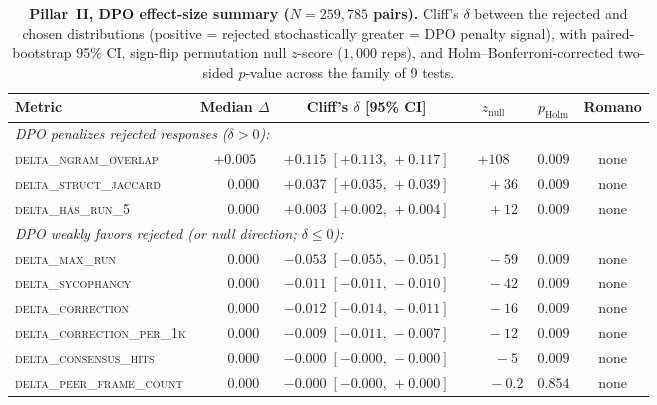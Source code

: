 \documentclass{article}
\begin{document}
\begin{table}[H]
\centering
\small
\caption{\textbf{Pillar~II, DPO effect-size summary ($N{=}259{,}785$ pairs).} Cliff's $\delta$ between the rejected and chosen distributions (positive = rejected stochastically greater = DPO penalty signal), with paired-bootstrap 95\% CI, sign-flip permutation null $z$-score ($1{,}000$ reps), and Holm--Bonferroni-corrected two-sided $p$-value across the family of 9 tests.}
\label{tab:data_audit}
\setlength{\tabcolsep}{4pt}
\begin{tabular}{lccccc}
\toprule
\textbf{Metric} & \textbf{Median $\Delta$} & \textbf{Cliff's $\delta$ [95\% CI]} & \textbf{$z_{\text{null}}$} & \textbf{$p_{\text{Holm}}$} & \textbf{Romano} \\
\midrule
\multicolumn{6}{l}{\emph{DPO penalizes rejected responses ($\delta>0$):}}\\
\textsc{delta\_ngram\_overlap}     & $+0.005$ & $+0.115\;[+0.113,\,+0.117]$ & $+108$ & $0.009$ & none \\
\textsc{delta\_struct\_jaccard}    & $\phantom{+}0.000$ & $+0.037\;[+0.035,\,+0.039]$ & $\phantom{+0}+36$ & $0.009$ & none \\
\textsc{delta\_has\_run\_5}        & $\phantom{+}0.000$ & $+0.003\;[+0.002,\,+0.004]$ & $\phantom{+0}+12$ & $0.009$ & none \\
\midrule
\multicolumn{6}{l}{\emph{DPO weakly favors rejected (or null direction; $\delta\leq 0$):}}\\
\textsc{delta\_max\_run}           & $\phantom{+}0.000$ & $-0.053\;[-0.055,\,-0.051]$ & $\phantom{+0}-59$ & $0.009$ & none \\
\textsc{delta\_sycophancy}         & $\phantom{+}0.000$ & $-0.011\;[-0.011,\,-0.010]$ & $\phantom{+0}-42$ & $0.009$ & none \\
\textsc{delta\_correction}         & $\phantom{+}0.000$ & $-0.012\;[-0.014,\,-0.011]$ & $\phantom{+0}-16$ & $0.009$ & none \\
\textsc{delta\_correction\_per\_1k}& $\phantom{+}0.000$ & $-0.009\;[-0.011,\,-0.007]$ & $\phantom{+0}-12$ & $0.009$ & none \\
\textsc{delta\_consensus\_hits}    & $\phantom{+}0.000$ & $-0.000\;[-0.000,\,-0.000]$ & $\phantom{+00}-5$ & $0.009$ & none \\
\textsc{delta\_peer\_frame\_count} & $\phantom{+}0.000$ & $-0.000\;[-0.000,\,+0.000]$ & $\phantom{+00}-0.2$ & $\mathbf{0.854}$ & none \\
\bottomrule
\end{tabular}
\end{table}
\end{document}
